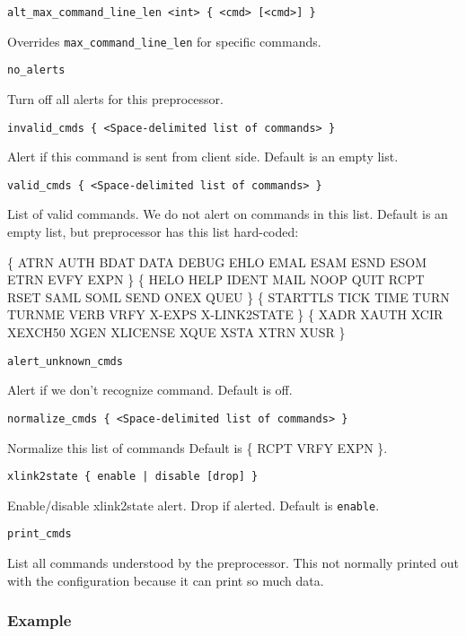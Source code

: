 \documentclass[english]{report}
\newcounter{slistnum}
\newenvironment{slist}
{ \begin{list}{ {\bf \arabic{slistnum}.} }{\usecounter{slistnum} } }
{ \end{list} }
\begin{document}
\begin{slist}
\item \texttt{alt\_max\_command\_line\_len <int> \{ <cmd> [<cmd>] \}}

Overrides \texttt{max\_command\_line\_len} for specific commands.

\item \texttt{no\_alerts}

Turn off all alerts for this preprocessor.

\item \texttt{invalid\_cmds \{ <Space-delimited list of commands> \}}

Alert if this command is sent from client side.  Default is an empty list.

\item \texttt{valid\_cmds \{ <Space-delimited list of commands> \}}

List of valid commands.  We do not alert on commands in this list.  Default is
an empty list, but preprocessor has this list hard-coded:

\{ ATRN AUTH BDAT DATA DEBUG EHLO EMAL ESAM ESND ESOM ETRN EVFY EXPN \}
\{ HELO HELP IDENT MAIL NOOP QUIT RCPT RSET SAML SOML SEND ONEX QUEU \}
\{ STARTTLS TICK TIME TURN TURNME VERB VRFY X-EXPS X-LINK2STATE \}
\{ XADR XAUTH XCIR XEXCH50 XGEN XLICENSE XQUE XSTA XTRN XUSR  \}

\item \texttt{alert\_unknown\_cmds}

Alert if we don't recognize command.  Default is off.

\item \texttt{normalize\_cmds \{ <Space-delimited list of commands> \}}

Normalize this list of commands Default is \{ RCPT VRFY EXPN \}.

\item \texttt{xlink2state \{ enable | disable [drop] \}}

Enable/disable xlink2state alert.  Drop if alerted.  Default is
\texttt{enable}.

\item \texttt{print\_cmds}

List all commands understood by the preprocessor.  This not normally printed
out with the configuration because it can print so much data.

\end{slist}

\subsubsection{Example}
\end{document}
